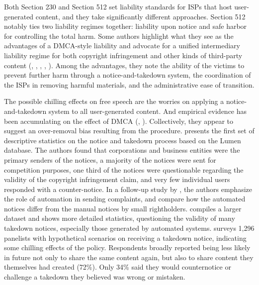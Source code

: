Both Section 230 and Section 512 set liability standards for ISPs that host user-generated content, and they take significantly different approaches. 
Section 512 notably ties two liability regimes together: liability upon notice and safe harbor for controlling the total harm. 
Some authors highlight what they see as the advantages of a DMCA-style liability and advocate for a unified intermediary liability regime for both copyright infringement and other kinds of third-party content (\cite{duran2003hear}, \cite{holmes2001making}, \cite{medenica2007does}, \cite{manekshaw2005liability}, \cite{band2002safe}). Among the advantages, they note the ability of the victims to prevent further harm through a notice-and-takedown system, the coordination of the ISPs in removing harmful materials, and the administrative ease of transition.  


The possible chilling effects on free speech are the worries on applying a notice-and-takedown system to all user-generated content.
And empirical evidence has been accumulating on the effect of DMCA (\cite{keller2015empirical}, \cite{keller2020facts}). Collectively, they appear to suggest an over-removal bias resulting from the procedure.   
\cite{urban2005takedown} presents the first set of descriptive statistics on the notice and takedown process based on the Lumen database. The authors found that corporations and business entities were the primary senders of the notices, a majority of the notices were sent for competition purposes, one third of the notices were questionable regarding the validity of the copyright infringement claim, and very few individual users responded with a counter-notice. 
In a follow-up study by \cite{urban2017everyday}, the authors emphasize the role of automation in sending complaints, and compare how the automated notices differ from the manual notices by small rightholders. 
\cite{seng2020copyrighting} compiles a larger dataset and shows more detailed statistics, questioning the validity of many takedown notices, especially those generated by automated systems.
\cite{penney2019survey} surveys 1,296 panelists with hypothetical scenarios on receiving a takedown notice, indicating some chilling effects of the policy. Respondents broadly reported being less likely in future not only to share the same content again, but also to share content they themselves had created (72\%). Only 34\% said they would counternotice or challenge a takedown they believed was wrong or mistaken. 

